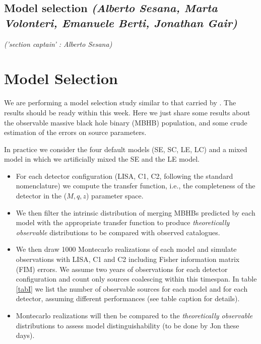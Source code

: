 \documentclass{iopart}
\begin{document}
\subsection{Model selection {\it (Alberto Sesana, Marta Volonteri, Emanuele Berti, Jonathan Gair) } }
\label{SS:MBHbModel}
{\it ('section captain' : Alberto Sesana) }

\section{Model Selection}
We are performing a model selection study similar to that carried by \cite{ses11}. The results should be ready within this week. Here we just share some results about the observable massive black hole binary (MBHB) population, and some crude estimation of the errors on source parameters.

In practice we consider the four default models (SE, SC, LE, LC) and a mixed model in which we artificially mixed the SE and the LE model. 
\begin{itemize}
\item For each detector configuration (LISA, C1, C2, following the standard nomenclature) we compute the transfer function, i.e., the completeness of the detector in the ($M,q,z$) parameter space. 

\item We then filter the intrinsic distribution of merging MBHBs predicted by each model with the appropriate transfer function to produce {\it theoretically observable} distributions to be compared with observed catalogues. 

\item We then draw 1000 Montecarlo realizations of each model and simulate observations with LISA, C1 and C2 including Fisher information matrix (FIM) errors. We assume two years of observations for each detector configuration and count only sources coalescing within this timespan. In table \ref{tabI} we list the number of observable sources for each model and for each detector, assuming different performances (see table caption for details).

\item Montecarlo realizations will then be compared to the {\it theoretically observable} distributions to assess model distinguishability (to be done by Jon these days).
\end{itemize}
\end{document}
